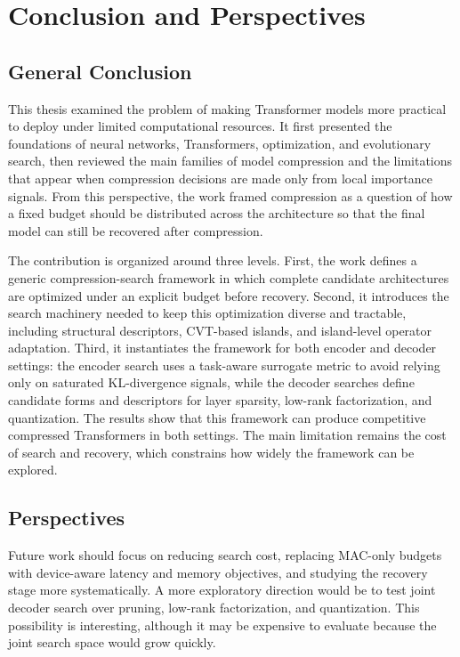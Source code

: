 \chapter*{Conclusion and Perspectives}
\label{chap:conclusion}

\section*{General Conclusion}

This thesis examined the problem of making Transformer models more practical to deploy under limited computational resources. It first presented the foundations of neural networks, Transformers, optimization, and evolutionary search, then reviewed the main families of model compression and the limitations that appear when compression decisions are made only from local importance signals. From this perspective, the work framed compression as a question of how a fixed budget should be distributed across the architecture so that the final model can still be recovered after compression.

The contribution is organized around three levels. First, the work defines a generic compression-search framework in which complete candidate architectures are optimized under an explicit budget before recovery. Second, it introduces the search machinery needed to keep this optimization diverse and tractable, including structural descriptors, CVT-based islands, and island-level operator adaptation. Third, it instantiates the framework for both encoder and decoder settings: the encoder search uses a task-aware surrogate metric to avoid relying only on saturated KL-divergence signals, while the decoder searches define candidate forms and descriptors for layer sparsity, low-rank factorization, and quantization. The results show that this framework can produce competitive compressed Transformers in both settings. The main limitation remains the cost of search and recovery, which constrains how widely the framework can be explored.

\section*{Perspectives}

Future work should focus on reducing search cost, replacing MAC-only budgets with device-aware latency and memory objectives, and studying the recovery stage more systematically. A more exploratory direction would be to test joint decoder search over pruning, low-rank factorization, and quantization. This possibility is interesting, although it may be expensive to evaluate because the joint search space would grow quickly.
